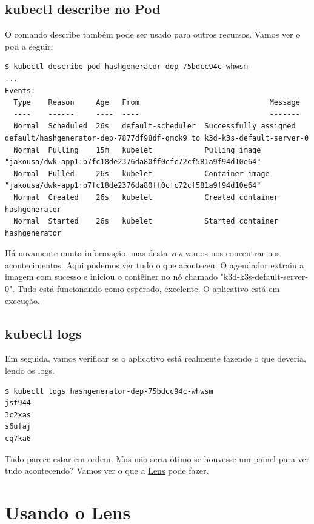 \documentclass[11pt,a4paper]{article}
\begin{document}
\subsection{kubectl describe no Pod}

O comando describe também pode ser usado para outros recursos. Vamos ver o pod a seguir:

\begin{verbatim}
$ kubectl describe pod hashgenerator-dep-75bdcc94c-whwsm
...
Events:
  Type    Reason     Age   From                              Message
  ----    ------     ----  ----                              -------
  Normal  Scheduled  26s   default-scheduler  Successfully assigned default/hashgenerator-dep-7877df98df-qmck9 to k3d-k3s-default-server-0
  Normal  Pulling    15m   kubelet            Pulling image "jakousa/dwk-app1:b7fc18de2376da80ff0cfc72cf581a9f94d10e64"
  Normal  Pulled     26s   kubelet            Container image "jakousa/dwk-app1:b7fc18de2376da80ff0cfc72cf581a9f94d10e64"
  Normal  Created    26s   kubelet            Created container hashgenerator
  Normal  Started    26s   kubelet            Started container hashgenerator
\end{verbatim}

Há novamente muita informação, mas desta vez vamos nos concentrar nos acontecimentos. Aqui podemos ver tudo o que aconteceu. O agendador extraiu a imagem com sucesso e iniciou o contêiner no nó chamado "k3d-k3s-default-server-0". Tudo está funcionando como esperado, excelente. O aplicativo está em execução.

\subsection{kubectl logs}

Em seguida, vamos verificar se o aplicativo está realmente fazendo o que deveria, lendo os logs.

\begin{verbatim}
$ kubectl logs hashgenerator-dep-75bdcc94c-whwsm
jst944
3c2xas
s6ufaj
cq7ka6
\end{verbatim}

Tudo parece estar em ordem. Mas não seria ótimo se houvesse um painel para ver tudo acontecendo? Vamos ver o que a \href{https://lenshq.io/}{Lens} pode fazer.

\section{Usando o Lens}
\end{document}
